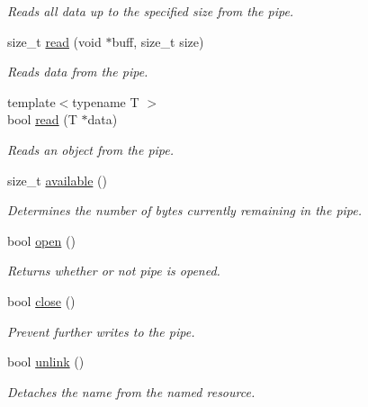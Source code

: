 \begin{DoxyCompactItemize}
\begin{DoxyCompactList}\small\item\em Reads all data up to the specified size from the pipe. \end{DoxyCompactList}\item 
size\+\_\+t \hyperlink{classcpen333_1_1process_1_1basic__pipe_a85cc99d4363243a02c7c0ee091f67270}{read} (void $\ast$buff, size\+\_\+t size)
\begin{DoxyCompactList}\small\item\em Reads data from the pipe. \end{DoxyCompactList}\item 
{\footnotesize template$<$typename T $>$ }\\bool \hyperlink{classcpen333_1_1process_1_1basic__pipe_a61e5b27ee80ba854cbacbfe82b1675e8}{read} (T $\ast$data)
\begin{DoxyCompactList}\small\item\em Reads an object from the pipe. \end{DoxyCompactList}\item 
size\+\_\+t \hyperlink{classcpen333_1_1process_1_1basic__pipe_a409e54ba4fd21f9769105804eb118fae}{available} ()
\begin{DoxyCompactList}\small\item\em Determines the number of bytes currently remaining in the pipe. \end{DoxyCompactList}\item 
bool \hyperlink{classcpen333_1_1process_1_1basic__pipe_a3931c0bae22d8f27fae99d7accbade88}{open} ()
\begin{DoxyCompactList}\small\item\em Returns whether or not pipe is opened. \end{DoxyCompactList}\item 
bool \hyperlink{classcpen333_1_1process_1_1basic__pipe_a9c0d0787a431449f58d730ae9d2c4f1d}{close} ()
\begin{DoxyCompactList}\small\item\em Prevent further writes to the pipe. \end{DoxyCompactList}\item 
bool \hyperlink{classcpen333_1_1process_1_1basic__pipe_a344a8291b20be973ade784922bdf37eb}{unlink} ()
\begin{DoxyCompactList}\small\item\em Detaches the name from the named resource. \end{DoxyCompactList}\end{DoxyCompactItemize}
